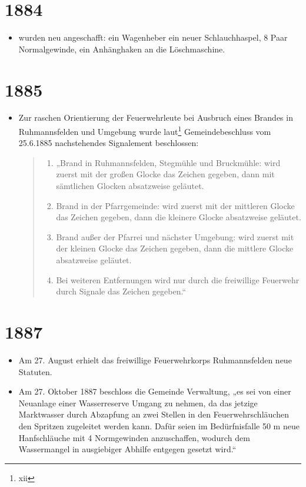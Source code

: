 \documentclass[12pt,a4paper]{book}
\begin{document}
\section*{1884}

\begin{itemize}
\item wurden neu angeschafft: ein Wagenheber ein neuer Schlauchhaspel, 8
Paar Normalgewinde, ein Anhänghaken an die Löschmaschine.
\end{itemize}

\section*{1885}

\begin{itemize}
\item Zur raschen Orientierung der Feuerwehrleute bei Ausbruch eines
Brandes in Ruhmannsfelden und Umgebung wurde laut\footnote{xii}
Gemeindebeschluss vom 25.6.1885 nachstehendes Signalement beschlossen:

\begin{quote}
\begin{enumerate}
\item „Brand in Ruhmannsfelden, Stegmühle und Bruckmühle: wird zuerst
mit der großen Glocke das Zeichen gegeben, dann mit sämtlichen Glocken
absatzweise geläutet.

\item Brand in der Pfarrgemeinde: wird zuerst mit der mittleren Glocke
das Zeichen gegeben, dann die kleinere Glocke absatzweise geläutet.

\item Brand außer der Pfarrei und nächster Umgebung: wird zuerst mit der
kleinen Glocke das Zeichen gegeben, dann die mittlere Glocke absatzweise
geläutet.

\item Bei weiteren Entfernungen wird nur durch die freiwillige Feuerwehr
durch Signale das Zeichen gegeben.“
\end{enumerate}
\end{quote}
\end{itemize}

\section*{1887}

\begin{itemize}
\item Am 27. August erhielt das freiwillige Feuerwehrkorps
Ruhmannsfelden neue Statuten.

\item Am 27. Oktober 1887 beschloss die Gemeinde Verwaltung, „es sei von
einer Neuanlage einer Wasserreserve Umgang zu nehmen, da das jetzige
Marktwasser durch Abzapfung an zwei Stellen in den Feuerwehrschläuchen
den Spritzen zugeleitet werden kann. Dafür seien im Bedürfnisfalle 50 m
neue Hanfschläuche mit 4 Normgewinden anzuschaffen, wodurch dem
Wassermangel in ausgiebiger Abhilfe entgegen gesetzt wird.“
\end{itemize}
\end{document}
